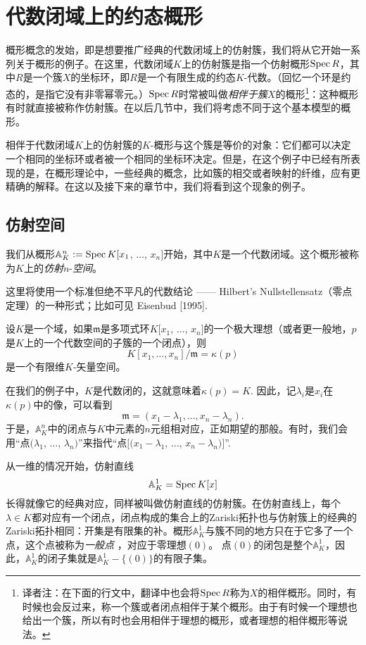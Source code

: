 \section{代数闭域上的约态概形}

概形概念的发始，即是想要推广经典的代数闭域上的仿射簇，我们将从它开始一系列关于概形的例子。在这里，代数闭域$K$上的仿射簇是指一个仿射概形$\operatorname{Spec} R$，其中$R$是一个簇$X$的坐标环，即$R$是一个有限生成的约态$K$\hyp 代数。（回忆一个环是约态的，是指它没有非零幂零元。）$\operatorname{Spec} R$时常被叫做\textit{相伴于簇}$X$的概形\footnote{译者注：在下面的行文中，翻译中也会将$\operatorname{Spec} R$称为$X$的相伴概形。同时，有时候也会反过来，称一个簇或者闭点相伴于某个概形。由于有时候一个理想也给出一个簇，所以有时也会用相伴于理想的概形，或者理想的相伴概形等说法。}：这种概形有时就直接被称作仿射簇。在以后几节中，我们将考虑不同于这个基本模型的概形。

相伴于代数闭域$K$上的仿射簇的$K$\hyp 概形与这个簇是等价的对象：它们都可以决定一个相同的坐标环或者被一个相同的坐标环决定。但是，在这个例子中已经有所表现的是，在概形理论中，一些经典的概念，比如簇的相交或者映射的纤维，应有更精确的解释。在这以及接下来的章节中，我们将看到这个现象的例子。

\subsection{仿射空间}

我们从概形$\mathbb{A}^n_K:=\operatorname{Spec} K[x_1$, $\dots$, $x_n]$开始，其中$K$是一个代数闭域。这个概形被称为$K$上的\textit{仿射}$n$-\textit{空间}。

这里将使用一个标准但绝不平凡的代数结论 ------ Hilbert's Nullstellensatz（零点定理）的一种形式；比如可见 Eisenbud [1995].

\begin{thm}[Nullstellensatz]
	设$K$是一个域，如果$\mathfrak{m}$是多项式环$K[x_1$, $\dots$, $x_n]$的一个极大理想（或者更一般地，$p$是$K$上的一个代数空间的子簇的一个闭点），则
	\[
		K[x_1, \dots, x_n]/\mathfrak{m}=\kappa(p)
	\]
	是一个有限维$K$\hyp 矢量空间。
\end{thm}

在我们的例子中，$K$是代数闭的，这就意味着$\kappa(p)=K$. 因此，记$\lambda_i$是$x_i$在$\kappa(p)$中的像，可以看到
\[
	\mathfrak{m}=(x_1-\lambda_1, \dots, x_n-\lambda_n).
\]
于是，$\mathbb{A}^n_K$中的闭点与$K$中元素的$n$元组相对应，正如期望的那般。有时，我们会用“点$(\lambda_1$, $\dots$, $\lambda_n)$”来指代“点$[(x_1-\lambda_1$, $\dots$, $x_n-\lambda_n)]$”. 

从一维的情况开始，仿射直线
\[
	\mathbb{A}^1_K=\operatorname{Spec} K[x]
\]
长得就像它的经典对应，同样被叫做仿射直线的仿射簇。在仿射直线上，每个$\lambda\in K$都对应有一个闭点，闭点构成的集合上的Zariski拓扑也与仿射簇上的经典的Zariski拓扑相同：开集是有限集的补。概形$\mathbb{A}^1_K$与簇不同的地方只在于它多了一个点，这个点被称为\textit{一般点}%
，对应于零理想$(0)$。
\vspace{-1ex}\vspace{-2ex}
点$(0)$的闭包是整个$\mathbb{A}^1_K$，因此，$\mathbb{A}^1_K$的闭子集就是$\mathbb{A}^1_K-\{(0)\}$的有限子集。

